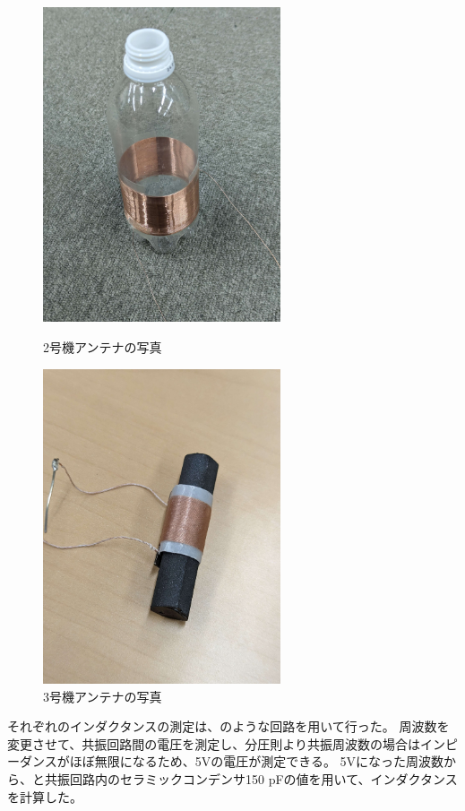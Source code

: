\documentclass[report.tex]{subfiles}
\begin{document}
\begin{figure}[H]
	\begin{minipage}[b]{0.5\linewidth}
		\centering
		\includegraphics[width=7cm]{fig/2.jpg}
		\caption{2号機アンテナの写真}
		\label{fig:2}
	\end{minipage}
	\begin{minipage}[b]{0.5\linewidth}
		\centering
		\includegraphics[width=7cm]{fig/3.jpg}
		\caption{3号機アンテナの写真}
		\label{fig:3}
	\end{minipage}
\end{figure}

それぞれのインダクタンスの測定は、のような回路を用いて行った。
周波数を変更させて、共振回路間の電圧を測定し、分圧則より共振周波数の場合はインピーダンスがほぼ無限になるため、5Vの電圧が測定できる。
5Vになった周波数から、と共振回路内のセラミックコンデンサ150 pFの値を用いて、インダクタンスを計算した。
\end{document}
